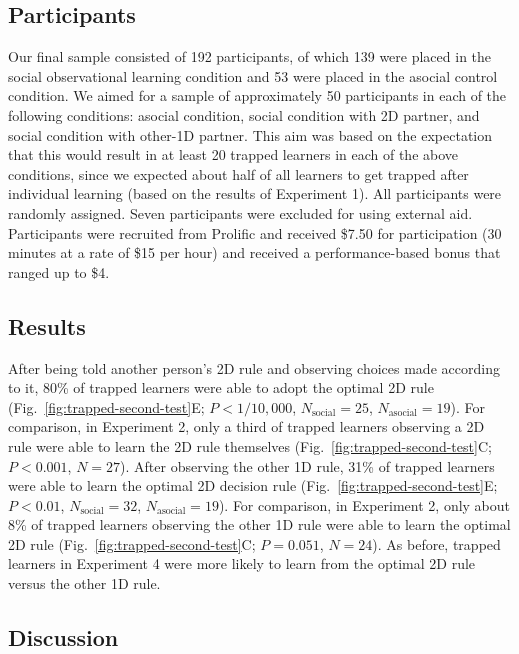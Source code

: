 \documentclass[11pt]{article} %
\begin{document}
\subsection{Participants} 

Our final sample consisted of 192 participants, of which 139 were placed in the social observational learning condition and 53 were placed in the asocial control condition. We aimed for a sample of approximately 50 participants in each of the following conditions: asocial condition, social condition with 2D partner, and social condition with other-1D partner. This aim was based on the expectation that this would result in at least 20 trapped learners in each of the above conditions, since we expected about half of all learners to get trapped after individual learning (based on the results of Experiment 1). All participants were randomly assigned. Seven participants were excluded for using external aid. Participants were recruited from Prolific and received \$7.50 for participation (30 minutes at a rate of \$15 per hour) and received a performance-based bonus that ranged up to \$4.

\subsection{Results} 

After being told another person's 2D rule and observing choices made according to it, 80\% of trapped learners were able to adopt the optimal 2D rule (Fig.~\ref{fig:trapped-second-test}E; $P<1/10,000$, $N_{\text{social}}=25$, $N_{\text{asocial}}=19$). For comparison, in Experiment 2, only a third of trapped learners observing a 2D rule were able to learn the 2D rule themselves (Fig.~\ref{fig:trapped-second-test}C; $P<0.001$, $N=27$). After observing the other 1D rule, 31\% of trapped learners were able to learn the optimal 2D decision rule (Fig.~\ref{fig:trapped-second-test}E; $P<0.01$,  $N_{\text{social}}=32$, $N_{\text{asocial}}=19$). For comparison, in Experiment 2, only about 8\% of trapped learners observing the other 1D rule were able to learn the optimal 2D rule (Fig.~\ref{fig:trapped-second-test}C; $P=0.051$, $N=24$). As before, trapped learners in Experiment 4 were more likely to learn from the optimal 2D rule versus the other 1D rule. 

\subsection{Discussion}
\end{document}
